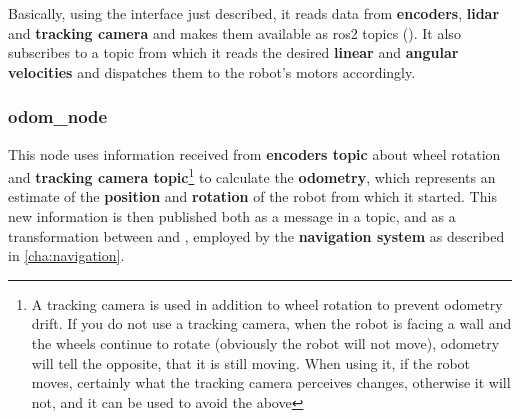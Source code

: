 Basically, using the interface just described, it reads data from \textbf{encoders}, \textbf{lidar} and \textbf{tracking camera} and makes them available as \acrshort{ros}2 topics (). It also subscribes to a  topic from which it reads the desired \textbf{linear} and \textbf{angular velocities} and dispatches them to the robot's motors accordingly.

\subsubsection{odom\_node}

This node uses information received from \textbf{encoders topic} about wheel rotation and \textbf{tracking camera topic}\footnote{A tracking camera is used in addition to wheel rotation to prevent odometry drift. If you do not use a tracking camera, when the robot is facing a wall and the wheels continue to rotate (obviously the robot will not move), odometry will tell the opposite, that it is still moving. When using it, if the robot moves, certainly what the tracking camera perceives changes, otherwise it will not, and it can be used to avoid the above} to calculate the \textbf{odometry}, which represents an estimate of the \textbf{position} and \textbf{rotation} of the robot from which it started. This new information is then published both as a message in a topic, and as a transformation between  and , employed by the \textbf{navigation system} as described in \autoref{cha:navigation}.